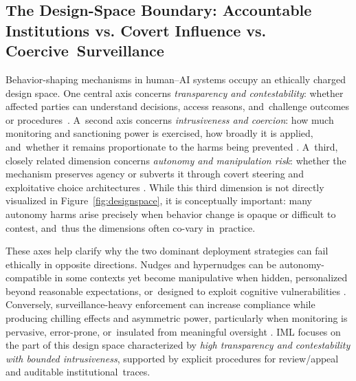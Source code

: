 \documentclass[mca,article,accept,pdftex,oneauthor]{Definitions/mdpi}
\begin{document}
\subsection{The Design-Space Boundary: Accountable Institutions vs. Covert Influence vs. Coercive~Surveillance}
\label{sec:boundary}

Behavior-shaping mechanisms in human--AI systems occupy an ethically charged design space. One central axis concerns \emph{transparency and contestability}: whether affected parties can understand decisions, access reasons, and~challenge outcomes or \mbox{procedures \citep{Kroll2017AccountableAlgorithms,Lee2019ProceduralJustice}.} A~second axis concerns \emph{intrusiveness and coercion}: how much monitoring and sanctioning power is exercised, how broadly it is applied, and~whether it remains proportionate to the harms being prevented \citep{Ostrom1990,Lyon2007Surveillance}. A~third, closely related dimension concerns \emph{autonomy and manipulation risk}: whether the mechanism preserves agency or subverts it through covert steering and exploitative choice architectures \citep{SusserRoesslerNissenbaum2019,HausmanWelch2010Nudge}. While this third dimension is not directly visualized in Figure~\ref{fig:designspace}, it is conceptually important: many autonomy harms arise precisely when behavior change is opaque or difficult to contest, and~thus the dimensions often co-vary in~practice.

These axes help clarify why the two dominant deployment strategies can fail ethically in opposite directions. Nudges and hypernudges can be autonomy-compatible in some contexts yet become manipulative when hidden, personalized beyond reasonable expectations, or~designed to exploit cognitive vulnerabilities \citep{ThalerSunstein2008,Yeung2017Hypernudge,SusserRoesslerNissenbaum2019}. Conversely, surveillance-heavy enforcement can increase compliance while producing chilling effects and asymmetric power, particularly when monitoring is pervasive, error-prone, or~insulated from meaningful oversight \citep{Zuboff2019,Foucault1977DisciplinePunish}. IML focuses on the part of this design space characterized by \emph{high transparency and contestability with bounded intrusiveness}, supported by explicit procedures for review/appeal and auditable institutional~traces.

\end{document}
